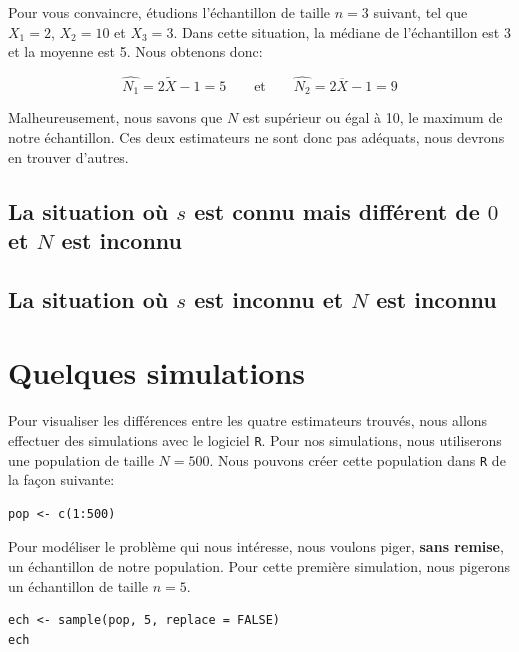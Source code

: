 \documentclass[10pt]{article}
\begin{document}
Pour vous convaincre, étudions l'échantillon de taille \(n=3\) suivant,
tel que \(X_1=2\), \(X_2=10\) et \(X_3=3\). Dans cette situation, la
médiane de l'échantillon est 3 et la moyenne est 5. Nous obtenons donc:

\[\widehat{N_1}=2\widetilde{X}-1=5 \qquad \text{et} \qquad \widehat{N_2}=2\overline{X}-1=9 \]

Malheureusement, nous savons que \(N\) est supérieur ou égal à 10, le
maximum de notre échantillon. Ces deux estimateurs ne sont donc pas
adéquats, nous devrons en trouver d'autres.

\subsection{\texorpdfstring{La situation où \(s\) est \textbf{connu}
mais différent de \(0\) et \(N\) est
\textbf{inconnu}}{La situation où s est connu mais différent de 0 et N est inconnu}}\label{la-situation-ou-s-est-connu-mais-different-de-0-et-n-est-inconnu}

\subsection{\texorpdfstring{La situation où \(s\) est \textbf{inconnu}
et \(N\) est
\textbf{inconnu}}{La situation où s est inconnu et N est inconnu}}\label{la-situation-ou-s-est-inconnu-et-n-est-inconnu}

\section{\texorpdfstring{Quelques simulations
\label{simul}}{Quelques simulations }}\label{quelques-simulations}

Pour visualiser les différences entre les quatre estimateurs trouvés,
nous allons effectuer des simulations avec le logiciel \texttt{R}. Pour
nos simulations, nous utiliserons une population de taille \(N=500\).
Nous pouvons créer cette population dans \texttt{R} de la façon
suivante:

\begin{verbatim}
pop <- c(1:500)
\end{verbatim}

Pour modéliser le problème qui nous intéresse, nous voulons piger,
\textbf{sans remise}, un échantillon de notre population. Pour cette
première simulation, nous pigerons un échantillon de taille \(n=5\).

\begin{verbatim}
ech <- sample(pop, 5, replace = FALSE)
ech
\end{verbatim}
\end{document}

